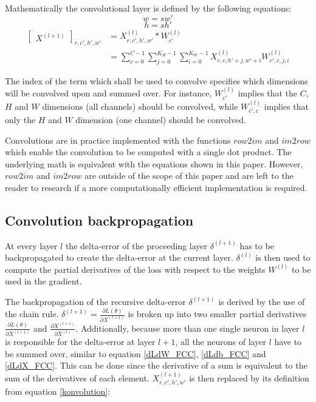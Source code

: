 \documentclass[a4paper, twoside]{article}
\newcommand*{\inpd}[2]{\ensuremath{\frac{\partial #1}{\partial #2}}}
\begin{document}
Mathematically the convolutional layer is defined by the following equations: \cite{cs231n} \cite{convmath}
\begin{equation}
w = sw'
\end{equation}
\begin{equation}
h = sh'
\end{equation}
\begin{equation}\label{konvolution}
\begin{split}
	\begin{bmatrix} X^{(l+1)} \end{bmatrix}_{r, c', h', w'}	
		& = X^{(l)}_{r, c', h', w'} *W^{(l)}_{c'} \\
		& = \sum^{C-1}_{c=0} \sum^{K_H-1}_{j=0} \sum^{K_W-1}_{i=0} X^{(l)}_{r, c, h'+j, w'+i}W^{(l)}_{c', c, j, i}
\end{split}
\end{equation}

The index of the term which shall be used to convolve specifies which dimensions will be convolved upon and summed over. For instance, $W^{(l)}_{c'}$ implies that the $C$, $H$ and $W$ dimensions (all channels) should be convolved, while $W^{(l)}_{c', c}$ implies that only the $H$ and $W$ dimension (one channel) should be convolved.

Convolutions are in practice implemented with the functions $row2im$ and $im2row$ which enable the convolution to be computed with a single dot product. The underlying math is equivalent with the equations shown in this paper. However, $row2im$ and $im2row$ are outside of the scope of this paper and are left to the reader to research if a more computationally efficient implementation is required. \cite{cs231n} \cite{convmath} \cite{convarithmetic}

\subsection{Convolution backpropagation}
At every layer $l$ the delta-error of the proceeding layer $\delta^{(l+1)}$ has to be backpropagated to create the delta-error at the current layer. $\delta^{(l)}$ is then used to compute the partial derivatives of the loss with respect to the weights $W^{(l)}$ to be used in the gradient. \cite{cs231n} \cite{convmath}

The backpropagation of the recursive delta-error $\delta^{(l+1)}$ is derived by the use of the chain rule. $\delta^{(l+1)} = \inpd{L(\theta)}{X^{(l+1)}}$ is broken up into two smaller partial derivatives $\inpd{L(\theta)}{X^{(l+1)}}$ and $\inpd{X^{(l+1)}}{X^{(l)}}$. Additionally, because more than one single neuron in layer $l$ is responsible for the delta-error at layer $l+1$, all the neurons of layer $l$ have to be summed over, similar to equation \eqref{dLdW_FCC}, \eqref{dLdb_FCC} and \eqref{dLdX_FCC}. This can be done since the derivative of a sum is equivalent to the sum of the derivatives of each element. $X^{(l+1)}_{r,c',h',w'}$ is then replaced by its definition from equation \eqref{konvolution}: \cite{convmath} \cite{webconv1} \cite{webconv2} \cite{webconv3}
\end{document}
